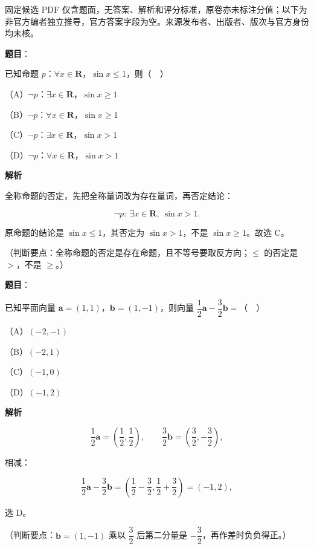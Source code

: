 

\begin{gktip}
固定候选 PDF 仅含题面，无答案、解析和评分标准，原卷亦未标注分值；以下为非官方编者独立推导，官方答案字段为空。来源发布者、出版者、版次与官方身份均未核。
\end{gktip}

\begin{answer}

\textbf{题目}：

已知命题 $p$：$\forall x\in\mathbf R$，$\sin x\leqslant1$，则（　）

（A）$\neg p$：$\exists x\in\mathbf R$，$\sin x\geqslant1$

（B）$\neg p$：$\forall x\in\mathbf R$，$\sin x\geqslant1$

（C）$\neg p$：$\exists x\in\mathbf R$，$\sin x>1$

（D）$\neg p$：$\forall x\in\mathbf R$，$\sin x>1$

\textbf{解析}

全称命题的否定，先把全称量词改为存在量词，再否定结论：

\nopagebreak[4]
\[\neg p:\ \exists x\in\mathbf R,\ \sin x>1.\]

原命题的结论是 $\sin x\leqslant1$，其否定为 $\sin x>1$，不是 $\sin x\geqslant1$。故选 C。

（判断要点：全称命题的否定是存在命题，且不等号要取反方向；$\leqslant$ 的否定是 $>$，不是 $\geqslant$。）


\end{answer}
\begin{answer}

\textbf{题目}：

已知平面向量 $\boldsymbol a=(1,1)$，$\boldsymbol b=(1,-1)$，则向量 $\dfrac12\boldsymbol a-\dfrac32\boldsymbol b=$（　）

（A）$(-2,-1)$

（B）$(-2,1)$

（C）$(-1,0)$

（D）$(-1,2)$

\textbf{解析}

\nopagebreak[4]
\[\frac12\boldsymbol a=\left(\frac12,\frac12\right),\qquad \frac32\boldsymbol b=\left(\frac32,-\frac32\right),\]

相减：

\nopagebreak[4]
\[\frac12\boldsymbol a-\frac32\boldsymbol b=\left(\frac12-\frac32,\frac12+\frac32\right)=(-1,2),\]

选 D。

（判断要点：$\boldsymbol b=(1,-1)$ 乘以 $\dfrac32$ 后第二分量是 $-\dfrac32$，再作差时负负得正。）


\end{answer}
